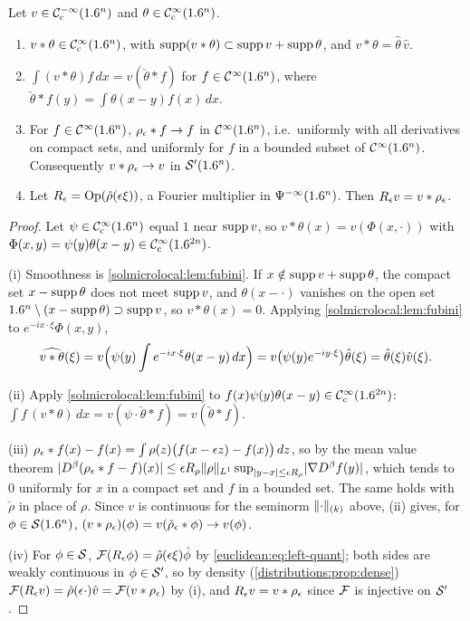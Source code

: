 \begin{lemma}\label{solmicrolocal:lem:convolution}
  Let $v\in\mathcal{C}^{-\infty}_{\mathrm{c}}(1.6^n)$ and $\theta\in\mathcal{C}^\infty_{\mathrm{c}}(1.6^n)$.
  \begin{enumerate}[label=\textup{(\roman*)}]
  \item $v*\theta\in\mathcal{C}^\infty_{\mathrm{c}}(1.6^n)$, with $\operatorname{supp}(v*\theta)\subset\operatorname{supp} v+\operatorname{supp}\theta$, and
    $\widehat{v*\theta}=\hat\theta\,\hat v$.
  \item $\int(v*\theta)f\,dx=v(\check\theta*f)$ for $f\in\mathcal{C}^\infty(1.6^n)$, where
    $\check\theta*f(y)=\int\theta(x-y)f(x)\,dx$.
  \item For $f\in\mathcal{C}^\infty(1.6^n)$, $\rho_\epsilon*f\to f$ in $\mathcal{C}^\infty(1.6^n)$, i.e.\ uniformly with all
    derivatives on compact sets, and uniformly for $f$ in a bounded subset of $\mathcal{C}^\infty(1.6^n)$.
    Consequently $v*\rho_\epsilon\to v$ in $\mathcal{S}'(1.6^n)$.
  \item Let $R_\epsilon=\operatorname{Op}(\hat\rho(\epsilon\xi))$, a Fourier multiplier in $\Psi^{-\infty}(1.6^n)$. Then
    $R_\epsilon v=v*\rho_\epsilon$.
  \end{enumerate}
\end{lemma}
\begin{proof}
  Let $\psi\in\mathcal{C}^\infty_{\mathrm{c}}(1.6^n)$ equal $1$ near $\operatorname{supp} v$, so $v*\theta(x)=v(\Phi(x,\cdot))$ with
  $\Phi(x,y)=\psi(y)\theta(x-y)\in\mathcal{C}^\infty_{\mathrm{c}}(1.6^{2n})$.

  (i) Smoothness is \cref{solmicrolocal:lem:fubini}. If $x\notin\operatorname{supp} v+\operatorname{supp}\theta$, the
  compact set $x-\operatorname{supp}\theta$ does not meet $\operatorname{supp} v$, and $\theta(x-\cdot)$ vanishes on the open
  set $1.6^n\setminus(x-\operatorname{supp}\theta)\supset\operatorname{supp} v$, so $v*\theta(x)=0$. Applying
  \cref{solmicrolocal:lem:fubini} to $e^{-ix\cdot\xi}\Phi(x,y)$,
  \begin{equation*}
    \widehat{v*\theta}(\xi)=v\Bigl(\psi(y)\int e^{-ix\cdot\xi}\theta(x-y)\,dx\Bigr)
    =v\bigl(\psi(y)e^{-iy\cdot\xi}\bigr)\hat\theta(\xi)=\hat\theta(\xi)\hat v(\xi).
  \end{equation*}

  (ii) Apply \cref{solmicrolocal:lem:fubini} to $f(x)\psi(y)\theta(x-y)\in\mathcal{C}^\infty_{\mathrm{c}}(1.6^{2n})$:
  $\int f\,(v*\theta)\,dx=v(\psi\cdot\check\theta*f)=v(\check\theta*f)$.

  (iii) $\rho_\epsilon*f(x)-f(x)=\int\rho(z)\bigl(f(x-\epsilon z)-f(x)\bigr)\,dz$, so by the mean value
  theorem $\lvert D^\beta(\rho_\epsilon*f-f)(x)\rvert\le\epsilon R_\rho\lVert \rho\rVert_{L^1}\sup_{\lvert y-x\rvert\le\epsilon R_\rho}
  \lvert \nabla D^\beta f(y)\rvert$, which tends to $0$ uniformly for $x$ in a compact set and $f$ in a
  bounded set. The same holds with $\check\rho$ in place of $\rho$. Since $v$ is continuous for
  the seminorm $\lVert \cdot\rVert_{(k)}$ above, (ii) gives, for $\phi\in\mathcal{S}(1.6^n)$,
  $(v*\rho_\epsilon)(\phi)=v(\check\rho_\epsilon*\phi)\to v(\phi)$.

  (iv) For $\phi\in\mathcal{S}$, $\mathcal{F}(R_\epsilon\phi)=\hat\rho(\epsilon\xi)\hat\phi$ by
  \eqref{euclidean:eq:left-quant}; both sides are weakly continuous in $\phi\in\mathcal{S}'$, so by
  density (\cref{distributions:prop:dense}) $\mathcal{F}(R_\epsilon v)=\hat\rho(\epsilon\cdot)\hat v=\mathcal{F}(v*\rho_\epsilon)$
  by (i), and $R_\epsilon v=v*\rho_\epsilon$ since $\mathcal{F}$ is injective on $\mathcal{S}'$.
\end{proof}

